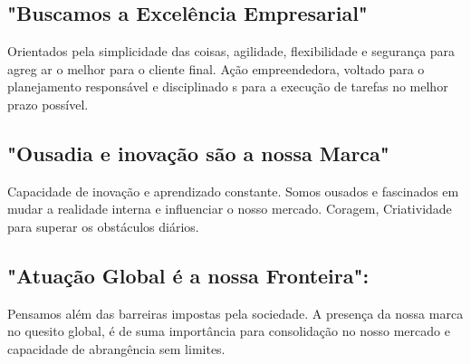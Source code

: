                     \begin{description}
                        \subsection{"Buscamos a Excelência Empresarial"} 
                        Orientados pela simplicidade das coisas, agilidade, flexibilidade e segurança para agreg
                        ar o melhor para o cliente final. Ação empreendedora, voltado para o planejamento responsável e disciplinado
                        s para a execução de tarefas no melhor prazo possível.
                        \end{description}

                        \begin{description}
                            \subsection{"Ousadia e inovação são a nossa Marca"} 
                            Capacidade de inovação e aprendizado constante. Somos ousados e fascinados em mudar a realidade
                            interna e influenciar o nosso mercado. Coragem, Criatividade para superar os obstáculos diários.
                            \end{description}

                            \begin{description}
                                \subsection{"Atuação Global é a nossa Fronteira":} 
                                Pensamos além das barreiras impostas pela sociedade. A presença da nossa marca no quesito global,
                                é de suma importância para consolidação no nosso mercado e capacidade de abrangência sem limites.
                                \end{description}
          

